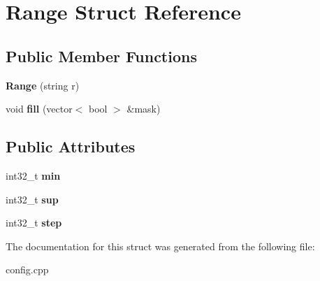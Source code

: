\hypertarget{structRange}{\section{Range Struct Reference}
\label{structRange}
}
\subsection*{Public Member Functions}
\begin{DoxyCompactItemize}
\item 
\hypertarget{structRange_a5466a03ba0e972866d4c08fb3599d2f7}{{\bfseries Range} (string r)}\label{structRange_a5466a03ba0e972866d4c08fb3599d2f7}

\item 
\hypertarget{structRange_a91b2b995792edfbc9b316913ecdc040a}{void {\bfseries fill} (vector$<$ bool $>$ \&mask)}\label{structRange_a91b2b995792edfbc9b316913ecdc040a}

\end{DoxyCompactItemize}
\subsection*{Public Attributes}
\begin{DoxyCompactItemize}
\item 
\hypertarget{structRange_afdf136475b38c534aea4a8c257b733da}{int32\-\_\-t {\bfseries min}}\label{structRange_afdf136475b38c534aea4a8c257b733da}

\item 
\hypertarget{structRange_a32a05af54e4f3c873c5efd8cca48f646}{int32\-\_\-t {\bfseries sup}}\label{structRange_a32a05af54e4f3c873c5efd8cca48f646}

\item 
\hypertarget{structRange_afae5ec5f48fe85b30c0c574355a0d145}{int32\-\_\-t {\bfseries step}}\label{structRange_afae5ec5f48fe85b30c0c574355a0d145}

\end{DoxyCompactItemize}


The documentation for this struct was generated from the following file\-:\begin{DoxyCompactItemize}
\item 
config.\-cpp\end{DoxyCompactItemize}
